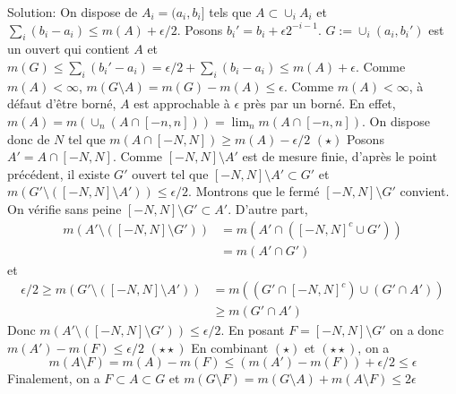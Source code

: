\documentclass{report}
\begin{document}
Solution: On dispose de $A_i=(a_i,b_i]$ tels que $A\subset \cup_i A_i$ et \newline $\sum_i (b_i-a_i) \leq m(A) + \epsilon/2$. Posons $b_i' = b_i + \epsilon 2^{-i-1}$. $G:=\cup_i (a_i,b_i')$ est un ouvert qui contient $A$ et $m(G)\leq \sum_i (b_i'-a_i) =\epsilon/2 + \sum_i (b_i-a_i) \leq m(A) + \epsilon   $. \newline
Comme $m(A)<\infty$, $m(G \setminus A)=m(G) - m(A)\leq \epsilon$. \newline \newline
Comme $m(A)<\infty$, à défaut d'être borné, $A$ est approchable à $\epsilon$ près par un borné. En effet, $m(A) = m(\cup_n (A\cap [-n,n])) = \lim_n m(A \cap [-n,n])$. On dispose donc de $N$ tel que $m(A \cap [-N,N])\geq m(A)-\epsilon/2$ \quad $(\star)$\newline
Posons $A' = A \cap [-N,N]$. Comme $[-N,N]\setminus A'$ est de mesure finie, \newline d'après le point précédent, il existe $G'$ ouvert tel que  $[-N,N]\setminus A' \subset G'$ et $m(G'\setminus ( [-N,N]\setminus A'))\leq \epsilon/2$. \newline Montrons que le fermé $[-N,N]\setminus G'$ convient. \newline On vérifie sans peine $[-N,N]\setminus G'\subset A'$. D'autre part, $$\begin{aligned} m(A'\setminus ([-N,N]\setminus G')) &= m(A'\cap ([-N,N]^c \cup G'))\\ &= m(A'\cap G') \end{aligned}$$ et
$$\begin{aligned} \epsilon/2 \geq m(G'\setminus ( [-N,N]\setminus A')) &= m((G'\cap [-N,N]^c) \cup (G'\cap A'))\\ &\geq m(G'\cap A')\end{aligned}$$
Donc $m(A'\setminus ([-N,N]\setminus G')) \leq \epsilon/2$. En posant $F = [-N,N]\setminus G'$ on a donc $m(A') - m(F) \leq \epsilon/2$ \quad $(\star \star)$ \newline \newline
 En combinant $(\star)$ et $(\star \star)$, on a $$m(A\setminus F) = m(A) - m(F) \leq (m(A') - m(F)) + \epsilon /2 \leq \epsilon $$
 Finalement, on a $F\subset A \subset G$ et $m(G\setminus F)  = m(G\setminus A) + m(A\setminus F) \leq 2\epsilon$  \\\\
 \\\\
\end{document}
